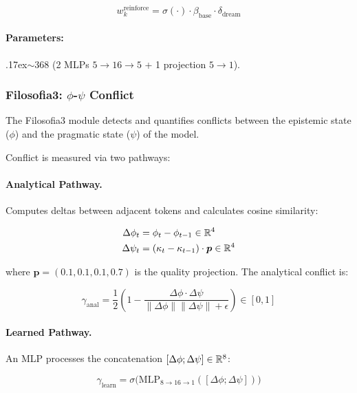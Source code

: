 \begin{equation}
    w_k^{\text{reinforce}} = \sigma(\cdot) \cdot \beta_{\text{base}} \cdot \delta_{\text{dream}}
\end{equation}

\paragraph{Parameters:} {\raise.17ex\hbox{$\scriptstyle\sim$}}368 (2 MLPs $5 \to 16 \to 5$ + 1 projection $5 \to 1$).

\subsubsection{Filosofia3: $\phi$-$\psi$ Conflict}
\label{sec:filosofia3}

The Filosofia3 module detects and quantifies conflicts between the
epistemic state ($\phi$) and the pragmatic state ($\psi$) of the model.

Conflict is measured via two pathways:

\paragraph{Analytical Pathway.}
Computes deltas between adjacent tokens and calculates cosine similarity:

\begin{align}
    \Delta\phi_t &= \phi_{t} - \phi_{t-1} \in \mathbb{R}^4 \\
    \Delta\psi_t &= (\kappa_t - \kappa_{t-1}) \cdot \bm{p} \in \mathbb{R}^4
\end{align}

where $\bm{p} = (0.1, 0.1, 0.1, 0.7)$ is the quality projection.
The analytical conflict is:

\begin{equation}
    \gamma_{\text{anal}} = \frac{1}{2}\left(1 - \frac{\Delta\phi \cdot \Delta\psi}{\|\Delta\phi\| \|\Delta\psi\| + \epsilon}\right) \in [0, 1]
\end{equation}

\paragraph{Learned Pathway.}
An MLP processes the concatenation $[\Delta\phi; \Delta\psi] \in \mathbb{R}^8$:

\begin{equation}
    \gamma_{\text{learn}} = \sigma\big(\text{MLP}_{8 \to 16 \to 1}([\Delta\phi; \Delta\psi])\big)
\end{equation}

